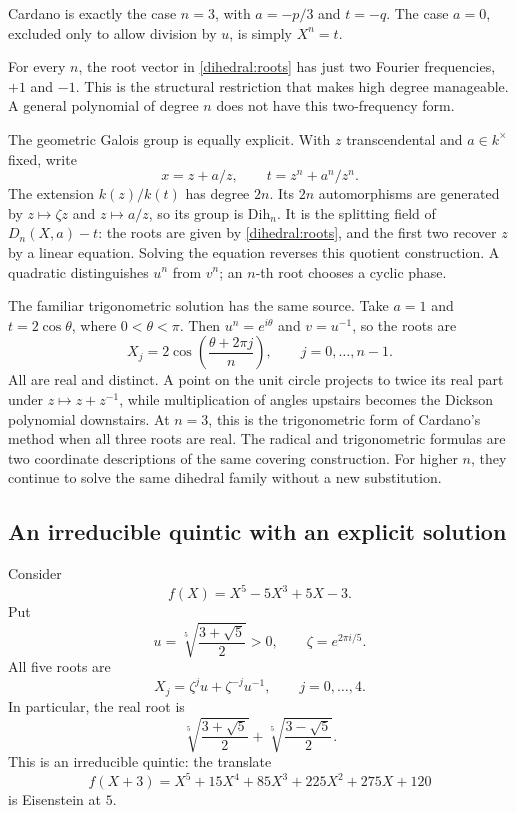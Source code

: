 \documentclass[11pt]{article}
\theoremstyle{remark}
\begin{document}
Cardano is exactly the case \(n=3\), with \(a=-p/3\) and \(t=-q\). The case \(a=0\), excluded only to allow division by \(u\), is simply \(X^n=t\).

For every \(n\), the root vector in \eqref{dihedral:roots} has just two Fourier frequencies, \(+1\) and \(-1\). This is the structural restriction that makes high degree manageable. A general polynomial of degree \(n\) does not have this two-frequency form.

The geometric Galois group is equally explicit. With \(z\) transcendental and \(a\in k^\times\) fixed, write
\[
x=z+a/z,\qquad t=z^n+a^n/z^n.
\]
The extension \(k(z)/k(t)\) has degree \(2n\). Its \(2n\) automorphisms are generated by \(z\mapsto\zeta z\) and \(z\mapsto a/z\), so its group is \(\mathrm{Dih}_n\). It is the splitting field of \(D_n(X,a)-t\): the roots are given by \eqref{dihedral:roots}, and the first two recover \(z\) by a linear equation. Solving the equation reverses this quotient construction. A quadratic distinguishes \(u^n\) from \(v^n\); an \(n\)-th root chooses a cyclic phase.

The familiar trigonometric solution has the same source. Take \(a=1\) and \(t=2\cos\theta\), where \(0<\theta<\pi\). Then \(u^n=e^{i\theta}\) and \(v=u^{-1}\), so the roots are
\[
X_j=2\cos\!\left(\frac{\theta+2\pi j}{n}\right),
\qquad j=0,\ldots,n-1.
\]
All are real and distinct. A point on the unit circle projects to twice its real part under \(z\mapsto z+z^{-1}\), while multiplication of angles upstairs becomes the Dickson polynomial downstairs. At \(n=3\), this is the trigonometric form of Cardano's method when all three roots are real. The radical and trigonometric formulas are two coordinate descriptions of the same covering construction. For higher \(n\), they continue to solve the same dihedral family without a new substitution.

\subsection{An irreducible quintic with an explicit solution}

Consider
\[
f(X)=X^5-5X^3+5X-3.
\]
Put
\[
u=\sqrt[5]{\frac{3+\sqrt5}{2}}>0,
\qquad \zeta=e^{2\pi i/5}.
\]
All five roots are
\[
X_j=\zeta^j u+\zeta^{-j}u^{-1},\qquad j=0,\ldots,4.
\]
In particular, the real root is
\[
\sqrt[5]{\frac{3+\sqrt5}{2}}
+\sqrt[5]{\frac{3-\sqrt5}{2}}.
\]
This is an irreducible quintic: the translate
\[
f(X+3)=X^5+15X^4+85X^3+225X^2+275X+120
\]
is Eisenstein at \(5\).
\end{document}
